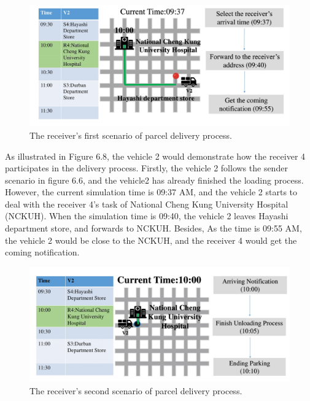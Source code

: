 \documentclass[12pt]{ksthesis}
\begin{document}
\begin{thesis}
{\begin{figure}[H]
\centering
\includegraphics[width=1.14\textwidth]{./Thesis_figures/F6-8_receiverScenario1.PNG}
\caption{\large The receiver's first scenario of parcel delivery process.}
\vspace{0.5cm}
\label{Fig:FirsrtReceiverScenario_deliveryProcess}
\end{figure}

As illustrated in Figure 6.8, the vehicle 2 would demonstrate how the receiver 4 participates in the delivery process. Firstly, the vehicle 2 follows the sender scenario in figure 6.6, and the vehicle2 has already finished the loading process.
However, the current simulation time is 09:37 AM, and the vehicle 2 starts to deal with the receiver 4’s task of National Cheng Kung University Hospital (NCKUH). When the simulation time is 09:40, the vehicle 2 leaves Hayashi department store, and forwards to NCKUH. Besides, As the time is 09:55 AM, the vehicle 2 would be close to the NCKUH, and the receiver 4 would get the coming notification.


\begin{figure}[H]
\centering
\includegraphics[width=1.14\textwidth]{./Thesis_figures/F6-9_receiverScenario2.PNG}
\caption{\large The receiver's second scenario of parcel delivery process.}
\vspace{0.5cm}
\label{Fig:Second_ReceiverScenario_DeliveryProcess}
\end{figure}

}
\end{thesis}
\end{document}
